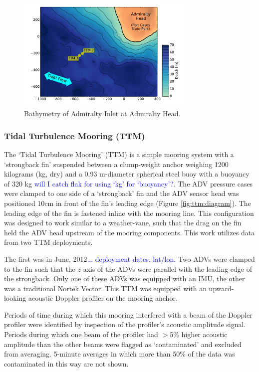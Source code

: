 \documentclass[twocol]{ametsoc}
\newcommand{\note}[1]{\textcolor{blue}{#1}}
\begin{document}
\begin{figure}[t]
  \centering
  \includegraphics[width=3.4in]{map02}
  \caption{Bathymetry of Admiralty Inlet at Admiralty Head.}
  \label{fig:map}
\end{figure}

\subsubsection{Tidal Turbulence Mooring (TTM)}

The `Tidal Turbulence Mooring' (TTM) is a simple mooring system with a `strongback fin' suspended between a clump-weight anchor weighing 1200 kilograms (kg, dry) and a 0.93 m-diameter spherical steel buoy with a buoyancy of 320 kg \note{will I catch flak for using `kg' for `buoyancy'?}. The ADV pressure cases were clamped to one side of a `strongback' fin and the ADV sensor head was positioned 10cm in front of the fin's leading edge (Figure \ref{fig:ttm:diagram}). The leading edge of the fin is fastened inline with the mooring line. This configuration  was designed to work similar to a weather-vane, such that the drag on the fin held the ADV head upstream of the mooring components.  This work utilizes data from two TTM deployments. 

The first was in June, 2012\note{... deployment dates, lat/lon.} Two ADVs were clamped to the fin such that the $z$-axis of the ADVs were parallel with the leading edge of the strongback. Only one of these ADVs was equipped with an IMU, the other was a traditional Nortek Vector. This TTM was equipped with an upward-looking acoustic Doppler profiler on the mooring anchor.

Periods of time during which this mooring interfered with a beam of the Doppler profiler were identified by inspection of the profiler's acoustic amplitude signal. Periods during which one beam of the profiler had $>5\%$ higher acoustic amplitude than the other beams were flagged as `contaminated' and excluded from averaging.  5-minute averages in which more than 50\% of the data was contaminated in this way are not shown.
\end{document}
